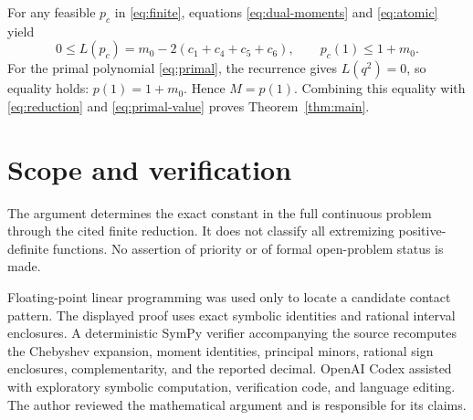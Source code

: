 \documentclass[11pt]{article}
\begin{document}
For any feasible $p_c$ in \eqref{eq:finite}, equations
\eqref{eq:dual-moments} and \eqref{eq:atomic} yield
\[
 0\leq L(p_c)=m_0-2(c_1+c_4+c_5+c_6),
 \qquad p_c(1)\leq1+m_0.
\]
For the primal polynomial \eqref{eq:primal}, the recurrence gives
$L(q^2)=0$, so equality holds: $p(1)=1+m_0$.  Hence $M=p(1)$.
Combining this equality with \eqref{eq:reduction} and
\eqref{eq:primal-value} proves Theorem~\ref{thm:main}.

\section{Scope and verification}

The argument determines the exact constant in the full continuous problem
through the cited finite reduction.  It does not classify all extremizing
positive-definite functions.  No assertion of priority or of formal
open-problem status is made.

Floating-point linear programming was used only to locate a candidate
contact pattern.  The displayed proof uses exact symbolic identities and
rational interval enclosures.  A deterministic SymPy verifier accompanying
the source recomputes the Chebyshev expansion, moment identities, principal
minors, rational sign enclosures, complementarity, and the reported decimal.
OpenAI Codex assisted with exploratory symbolic computation, verification
code, and language editing.  The author reviewed the mathematical argument
and is responsible for its claims.

\small


\end{document}
